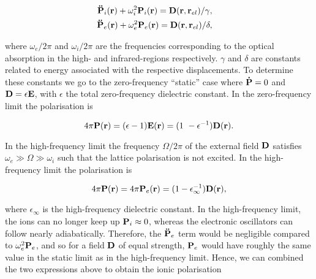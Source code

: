 \begin{subequations}
\begin{align}
    \begin{split}
        \vb{\ddot{P}}_{i}(\vb{r}) + \omega^2_{i} \vb{P}_{i}(\vb{r}) &= \vb{D}(\vb{r}, \vb{r}_{el}) / \gamma,
    \end{split}\\
    \begin{split}
        \vb{\ddot{P}}_{e}(\vb{r}) + \omega^2_{e} \vb{P}_{e}(\vb{r}) &= \vb{D}(\vb{r}, \vb{r}_{el}) / \delta,
    \end{split}
\end{align}
\end{subequations}

where $\omega_{e}/2\pi$ and $\omega_{i}/2\pi$ are the frequencies corresponding to the optical absorption in the high- and infrared-regions respectively. $\gamma$ and $\delta$ are constants related to energy associated with the respective displacements. To determine these constants we go to the zero-frequency ``static'' case where $\vb{\dot{P}} = 0$ and $\vb{D} = \epsilon \vb{E}$, with $\epsilon$ the total zero-frequency dielectric constant. In the zero-frequency limit the polarisation is

\begin{equation}
    4\pi \vb{P}(\vb{r}) = (\epsilon - 1) \vb{E}(\vb{r}) = (1\ - \epsilon^{-1}) \vb{D}(\vb{r}).
\end{equation}

In the high-frequency limit the frequency $\Omega / 2\pi$ of the external field $\vb{D}$ satisfies $\omega_e \gg \Omega \gg \omega_i$ such that the lattice polarisation is not excited. In the high-frequency limit the polarisation is

\begin{equation}
    4\pi\vb{P}(\vb{r}) = 4\pi\vb{P}_e(\vb{r}) = (1 - \epsilon_\infty^{-1}) \vb{D}(\vb{r}),
\end{equation}

where $\epsilon_\infty$ is the high-frequency dielectric constant. In the high-frequency limit, the ions can no longer keep up $\vb{P}_{i} \approx 0$, whereas the electronic oscillators can follow nearly adiabatically. Therefore, the $\vb{\ddot{P}}_{e}$ term would be negligible compared to $\omega^2_{e} \vb{P}_{e}$, and so for a field $\vb{D}$ of equal strength, $\vb{P}_e$ would have roughly the same value in the static limit as in the high-frequency limit. Hence, we can combined the two expressions above to obtain the ionic polarisation

